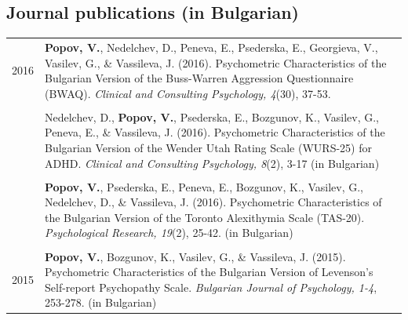 \documentclass[letterpaper]{article}
\begin{document}
\subsection*{Journal publications (in Bulgarian)}
\begin{longtable}{p{0.7cm}p{15cm}}
  2016 & \textbf{Popov, V.}, Nedelchev, D., Peneva, E., Psederska, E., Georgieva, V., Vasilev, G., \& Vassileva, J. (2016). Psychometric Characteristics of the Bulgarian Version of the Buss-Warren Aggression Questionnaire (BWAQ). {\it Clinical and Consulting Psychology, 4}(30), 37-53.            \\[6pt]
  &                                                                                                                                                                                                                                                                                                 \\
  & Nedelchev, D., \textbf{Popov, V.}, Psederska, E., Bozgunov, K., Vasilev, G., Peneva, E., \& Vassileva, J. (2016). Psychometric Characteristics of the Bulgarian Version of the Wender Utah Rating Scale (WURS-25) for ADHD. {\it Clinical and Consulting Psychology, 8}(2), 3-17 (in Bulgarian) \\[6pt]
  &                                                                                                                                                                                                                                                                                                 \\
  & \textbf{Popov, V.}, Psederska, E., Peneva, E., Bozgunov, K., Vasilev, G., Nedelchev, D., \& Vassileva, J. (2016). Psychometric Characteristics of the Bulgarian Version of the Toronto Alexithymia Scale (TAS-20). {\it Psychological Research, 19}(2), 25-42. (in Bulgarian)                   \\[6pt]
  &                                                                                                                                                                                                                                                                                                 \\
  2015 & \textbf{Popov, V.}, Bozgunov, K., Vasilev, G., \& Vassileva, J. (2015). Psychometric Characteristics of the Bulgarian Version of Levenson's Self-report Psychopathy Scale. {\it Bulgarian Journal of Psychology, 1-4}, 253-278.  (in Bulgarian)                                                 \\
\end{longtable}
\end{document}
